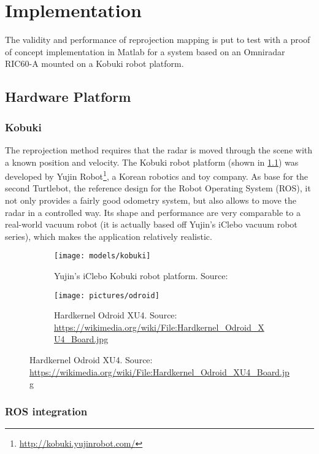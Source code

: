 \chapter{Implementation}\label{implementation}

The validity and performance of reprojection mapping is put to test with a proof of concept implementation in Matlab for a system based on an Omniradar RIC60-A mounted on a Kobuki robot platform.

\section{Hardware Platform}\label{implementation-platform}

\subsection{Kobuki}\label{kobuki}

The reprojection method requires that the radar is moved through the scene with a known position and velocity. The Kobuki robot platform (shown in \cref{fig:kobuki}) was developed by Yujin Robot\footnote{\url{http://kobuki.yujinrobot.com/}}, a Korean robotics and toy company. As base for the second Turtlebot, the reference design for the Robot Operating System (ROS), it not only provides a fairly good odometry system, but also allows to move the radar in a controlled way. Its shape and performance are very comparable to a real-world vacuum robot (it is actually based off Yujin's iClebo vacuum robot series), which makes the application relatively realistic.

\begin{figure}[htbp]
    \centering
    \begin{subfigure}{0.45\textwidth}
        \texttt{[image: models/kobuki]}
        \caption{Yujin's iClebo Kobuki robot platform. Source: \cite{DesignK2013}}
        \label{fig:kobuki}
    \end{subfigure}
    \hfill
    \begin{subfigure}{0.45\textwidth}
        \texttt{[image: pictures/odroid]}
        \caption{Hardkernel Odroid XU4. Source: \url{https://wikimedia.org/wiki/File:Hardkernel_Odroid_XU4_Board.jpg}}
        \label{fig:odroid}
    \end{subfigure}
\end{figure}

\subsection{ROS integration}\label{ros-integration}

